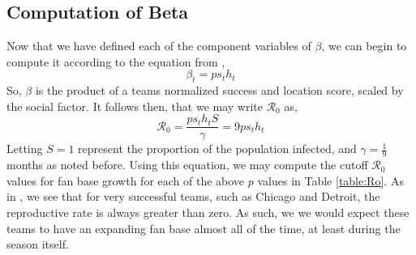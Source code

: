 \documentclass[11pt]{report}            %
\newcommand{\ro}{\mathcal{R}_0}
\begin{document}
\subsection*{Computation of Beta}
Now that we have defined each of the component variables of $\beta$, we can begin to compute it according to the equation from \cite{light},
\begin{equation}\label{beta}
\beta_t=ps_th_t
\end{equation}
So, $\beta$ is the product of a teams normalized success and location score, scaled by the social factor. It follows then, that we may write $\ro$ as,
\begin{equation}\label{Ro}
\ro = \frac{ps_th_tS}{\gamma} = 9ps_th_t
\end{equation}
Letting $S=1$ represent the proportion of the population infected, and $\gamma=\frac{1}{9}$months as noted before. Using this equation, we may compute the cutoff $\ro$ values for fan base growth for each of the above $p$ values in Table \ref{table:Ro}. As in \cite{light}, we see that for very successful teams, such as Chicago and Detroit, the reproductive rate is always greater than zero. As such, we we would expect these teams to have an expanding fan base almost all of the time, at least during the season itself.
\end{document}
